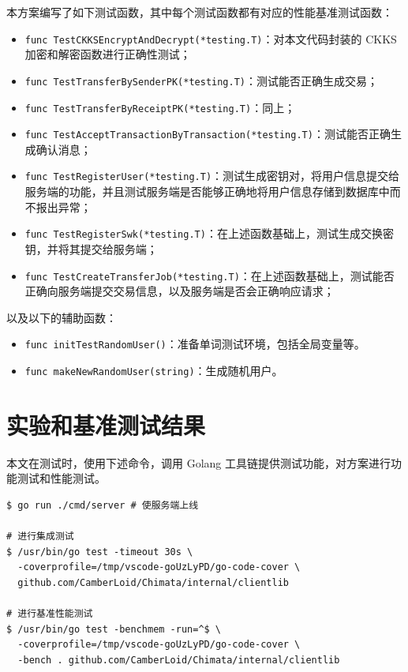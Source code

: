 本方案编写了如下测试函数，其中每个测试函数都有对应的性能基准测试函数：

\begin{itemize}
    \item \verb|func TestCKKSEncryptAndDecrypt(*testing.T)|：对本文代码封装的 CKKS 加密和解密函数进行正确性测试；
    \item \verb|func TestTransferBySenderPK(*testing.T)|：测试能否正确生成交易；
    \item \verb|func TestTransferByReceiptPK(*testing.T)|：同上；
    \item \verb|func TestAcceptTransactionByTransaction(*testing.T)|：测试能否正确生成确认消息；
    \item \verb|func TestRegisterUser(*testing.T)|：测试生成密钥对，将用户信息提交给服务端的功能，并且测试服务端是否能够正确地将用户信息存储到数据库中而不报出异常；
    \item \verb|func TestRegisterSwk(*testing.T)|：在上述函数基础上，测试生成交换密钥，并将其提交给服务端；
    \item \verb|func TestCreateTransferJob(*testing.T)|：在上述函数基础上，测试能否正确向服务端提交交易信息，以及服务端是否会正确响应请求；
\end{itemize}

以及以下的辅助函数：

\begin{itemize}
    \item \verb|func initTestRandomUser()|：准备单词测试环境，包括全局变量等。
    \item \verb|func makeNewRandomUser(string)|：生成随机用户。
\end{itemize}

\section{实验和基准测试结果}

本文在测试时，使用下述命令，调用 Golang 工具链提供测试功能，对方案进行功能测试和性能测试。

\begin{verbatim}
$ go run ./cmd/server # 使服务端上线

# 进行集成测试
$ /usr/bin/go test -timeout 30s \
  -coverprofile=/tmp/vscode-goUzLyPD/go-code-cover \
  github.com/CamberLoid/Chimata/internal/clientlib

# 进行基准性能测试
$ /usr/bin/go test -benchmem -run=^$ \
  -coverprofile=/tmp/vscode-goUzLyPD/go-code-cover \
  -bench . github.com/CamberLoid/Chimata/internal/clientlib
\end{verbatim}


